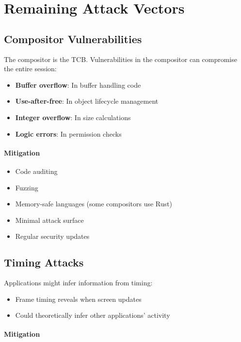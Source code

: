 \section{Remaining Attack Vectors}

\subsection{Compositor Vulnerabilities}

The compositor is the TCB. Vulnerabilities in the compositor can compromise the entire session:

\begin{itemize}
    \item \textbf{Buffer overflow}: In buffer handling code
    \item \textbf{Use-after-free}: In object lifecycle management
    \item \textbf{Integer overflow}: In size calculations
    \item \textbf{Logic errors}: In permission checks
\end{itemize}

\paragraph{Mitigation}

\begin{itemize}
    \item Code auditing
    \item Fuzzing
    \item Memory-safe languages (some compositors use Rust)
    \item Minimal attack surface
    \item Regular security updates
\end{itemize}

\subsection{Timing Attacks}

Applications might infer information from timing:

\begin{itemize}
    \item Frame timing reveals when screen updates
    \item Could theoretically infer other applications' activity
\end{itemize}

\paragraph{Mitigation}

